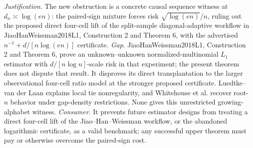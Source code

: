 \documentclass{article}
\begin{document}
\par\smallskip\noindent \textit{Justification.} The new obstruction is a concrete causal sequence witness at \(d_n\asymp\log(en)\): the paired-sign mixture forces risk \(\sqrt{\log(en)}/n\), ruling out the proposed direct four-cell lift of the split-sample diagonal-adaptive workflow in JiaoHanWeissman2018L1, Construction 2 and Theorem 6, with the advertised \(n^{-1}+d/[n\log(en)]\) certificate. \textit{Gap.} JiaoHanWeissman2018L1, Construction 2 and Theorem 6, prove an unknown--unknown normalized-multinomial \(L_1\) estimator with \(d/[n\log n]\)-scale risk in that experiment; the present theorem does not dispute that result. It disproves its direct transplantation to the larger observational four-cell ratio model at the stronger proposed certificate. Luedtke--van der Laan explains local tie nonregularity, and Whitehouse et al. recover root-\(n\) behavior under gap-density restrictions. None gives this unrestricted growing-alphabet witness. \textit{Consumer.} It prevents future estimator designs from treating a direct four-cell lift of the Jiao--Han--Weissman workflow, or the abandoned logarithmic certificate, as a valid benchmark; any successful upper theorem must pay or otherwise overcome the paired-sign cost.
\end{document}
